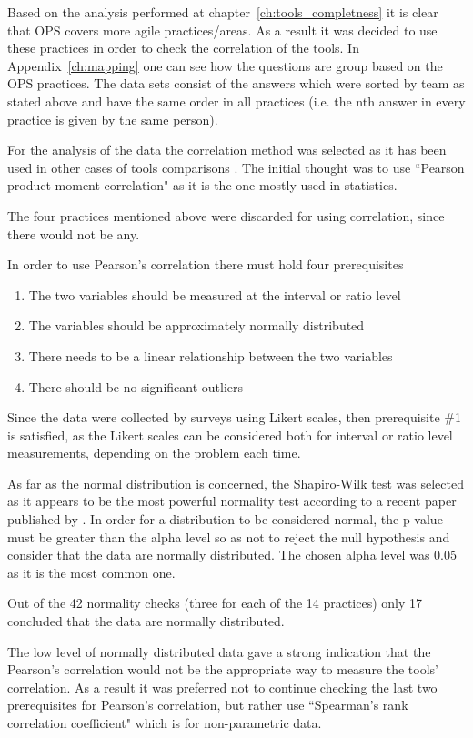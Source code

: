 Based on the analysis performed at chapter~\ref{ch:tools_completness} it is clear that OPS covers more agile practices/areas. As a result it was decided to use these practices in order to check the correlation of the tools. In Appendix~\ref{ch:mapping} one can see how the questions are group based on the OPS practices. The data sets consist of the answers which were sorted by team as stated above and have the same order in all practices (i.e. the nth answer in every practice is given by the same person).

For the analysis of the data the correlation method was selected as it has been used in other cases of tools comparisons \cite{jalali_angelis} \cite{Delestras2013}. The initial thought was to use ``Pearson product-moment correlation" as it is the one mostly used in statistics. 

The four practices mentioned above were discarded for using correlation, since there would not be any.

In order to use Pearson’s correlation there must hold four prerequisites
\begin{enumerate}
\item The two variables should be measured at the interval or ratio level
\item The variables should be approximately normally distributed
\item There needs to be a linear relationship between the two variables
\item There should be no significant outliers
\end{enumerate}

Since the data were collected by surveys using Likert scales, then prerequisite \#1 is satisfied, as the Likert scales can be considered both for interval or ratio level measurements, depending on the problem each time.

As far as the normal distribution is concerned, the Shapiro-Wilk test was selected as it appears to be the most powerful normality test according to a recent paper published by \citet{Razali}. In order for a distribution to be considered normal, the p-value must be greater than the alpha level so as not to reject the null hypothesis and consider that the data are normally distributed. The chosen alpha level was 0.05 as it is the most common one.

Out of the 42 normality checks (three for each of the 14 practices) only 17 concluded that the data are normally distributed. 

The low level of normally distributed data gave a strong indication that the Pearson’s correlation would not be the appropriate way to measure the tools' correlation. As a result it was preferred not to continue checking the last two prerequisites for Pearson’s correlation, but rather use ``Spearman’s rank correlation coefficient" which is for non-parametric data.


